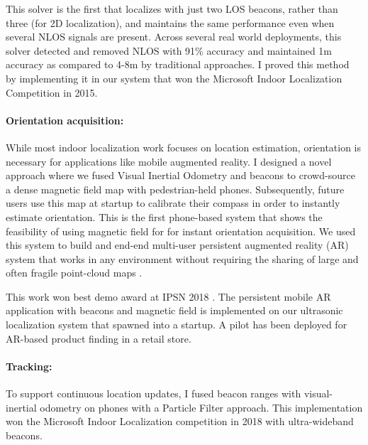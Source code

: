 \documentclass[10pt]{article}
\begin{document}
This solver is the first that localizes with just two LOS beacons, rather than three (for 2D localization), and maintains the same performance even when several NLOS signals are present. Across several real
world deployments, this solver detected and removed NLOS with 91\% accuracy and maintained 1m accuracy as compared to 4-8m by traditional approaches. I proved this method by implementing it in our system that won the Microsoft Indoor Localization Competition in 2015. 

\paragraph{Orientation acquisition: }
While most indoor localization work focuses on location
estimation, orientation is necessary for applications like mobile
augmented reality. %
I designed a novel approach where we fused Visual
Inertial Odometry and beacons to crowd-source a dense magnetic field
map with pedestrian-held phones. Subsequently, future users use this map at startup to calibrate
their compass in order to instantly estimate orientation. %
This is the first phone-based system that shows the feasibility of using magnetic field for
for instant orientation acquisition. %
We used
this system to build and end-end multi-user persistent augmented
reality (AR) system that works in any environment without requiring the
sharing of large and often fragile point-cloud maps \cite{mobileAR}. 

This work won best demo award at IPSN 2018 \cite{rajagopal2018welcome}. The persistent mobile AR application with beacons and magnetic field is implemented on our ultrasonic localization system that spawned into a startup. A pilot has been deployed for AR-based product finding in a retail store. 

\paragraph{Tracking:} To support continuous location updates, I fused beacon ranges with visual-inertial odometry on phones with a Particle Filter approach. This implementation won the Microsoft Indoor Localization competition in 2018 with ultra-wideband beacons.
\end{document}
